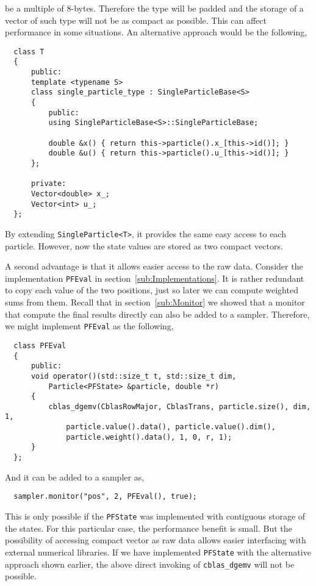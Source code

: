 be a multiple of 8-bytes. Therefore the type will be padded and the storage of
a vector of such type will not be as compact as possible. This can affect
performance in some situations. An alternative approach would be the following,
\begin{Verbatim}
  class T
  {
      public:
      template <typename S>
      class single_particle_type : SingleParticleBase<S>
      {
          public:
          using SingleParticleBase<S>::SingleParticleBase;

          double &x() { return this->particle().x_[this->id()]; }
          double &u() { return this->particle().u_[this->id()]; }
      };

      private:
      Vector<double> x_;
      Vector<int> u_;
  };
\end{Verbatim}
By extending \verb|SingleParticle<T>|, it provides the same easy access to each
particle. However, now the state values are stored as two compact vectors.

A second advantage is that it allows easier access to the raw data. Consider
the implementation \verb|PFEval| in section~\ref{sub:Implementations}. It is
rather redundant to copy each value of the two positions, just so later we can
compute weighted sums from them. Recall that in section~\ref{sub:Monitor} we
showed that a monitor that compute the final results directly can also be added
to a sampler. Therefore, we might implement \verb|PFEval| as the following,
\begin{Verbatim}
  class PFEval
  {
      public:
      void operator()(std::size_t t, std::size_t dim,
          Particle<PFState> &particle, double *r)
      {
          cblas_dgemv(CblasRowMajor, CblasTrans, particle.size(), dim, 1,
              particle.value().data(), particle.value().dim(),
              particle.weight().data(), 1, 0, r, 1);
      }
  };
\end{Verbatim}
And it can be added to a sampler as,
\begin{Verbatim}
  sampler.monitor("pos", 2, PFEval(), true);
\end{Verbatim}
This is only possible if the \verb|PFState| was implemented with contiguous
storage of the states. For this particular case, the performance benefit is
small. But the possibility of accessing compact vector as raw data allows
easier interfacing with external numerical libraries. If we have implemented
\verb|PFState| with the alternative approach shown earlier, the above direct
invoking of \verb|cblas_dgemv| will not be possible.
